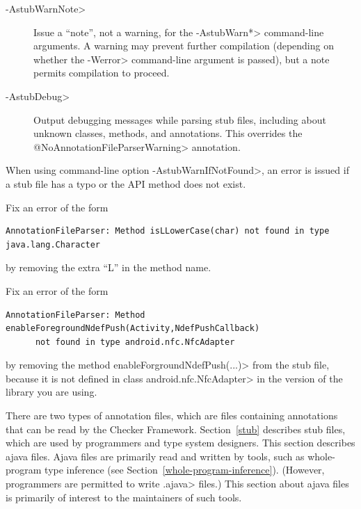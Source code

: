 \begin{description}

\item[\<-AstubWarnNote>]
  Issue a ``note'', not a warning, for the \<-AstubWarn*> command-line
  arguments.  A warning may prevent further compilation (depending on
  whether the \<-Werror> command-line argument is passed), but a note permits
  compilation to proceed.

\item[\<-AstubDebug>]
  Output debugging messages while parsing stub files, including about
  unknown classes, methods, and annotations.  This overrides the
  \<@NoAnnotationFileParserWarning> annotation.

\end{description}



When using command-line option \<-AstubWarnIfNotFound>,
an error is issued if a stub file has a typo or the API method does not
exist.

Fix an error of the form
\begin{Verbatim}
AnnotationFileParser: Method isLLowerCase(char) not found in type java.lang.Character
\end{Verbatim}

\noindent
by removing the extra ``L'' in the method name.

Fix an error of the form
\begin{Verbatim}
AnnotationFileParser: Method enableForegroundNdefPush(Activity,NdefPushCallback)
      not found in type android.nfc.NfcAdapter
\end{Verbatim}

\noindent
by removing the method \<enableForgroundNdefPush(...)> from
the stub file, because it is not defined in class \<android.nfc.NfcAdapter>
in the version of the library you are using.



There are two types of annotation files, which are files containing annotations that
can be read by the Checker Framework.
Section~\ref{stub} describes stub files, which are used by programmers and
type system designers.
This section describes ajava files.
Ajava files are primarily read and written by tools, such as whole-program type
inference (see Section~\ref{whole-program-inference}).  (However,
programmers are permitted to write \<.ajava> files.)
This section about
ajava files is primarily of interest to the maintainers of such tools.


